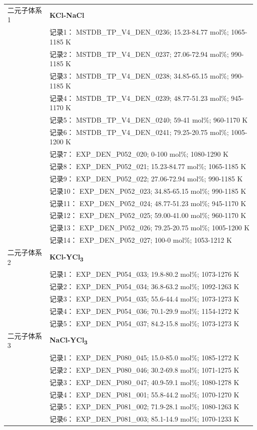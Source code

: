 \documentclass[12pt]{article}
\begin{document}
{\begin{longtable}[]{@{}
  >{\raggedright\arraybackslash}p{}
  >{\raggedright\arraybackslash}p{}@{}}
二元子体系 1  & \textbf{KCl-NaCl} \\
 & 记录1： MSTDB\_TP\_V4\_DEN\_0236; 15.23-84.77 mol\%; 1065-1185 K \\
 & 记录2： MSTDB\_TP\_V4\_DEN\_0237; 27.06-72.94 mol\%; 990-1185 K \\
 & 记录3： MSTDB\_TP\_V4\_DEN\_0238; 34.85-65.15 mol\%; 990-1185 K \\
 & 记录4： MSTDB\_TP\_V4\_DEN\_0239; 48.77-51.23 mol\%; 945-1170 K \\
 & 记录5： MSTDB\_TP\_V4\_DEN\_0240; 59-41 mol\%; 960-1170 K \\
 & 记录6： MSTDB\_TP\_V4\_DEN\_0241; 79.25-20.75 mol\%; 1005-1200 K \\
 & 记录7： EXP\_DEN\_P052\_020; 0-100 mol\%; 1080-1290 K \\
 & 记录8： EXP\_DEN\_P052\_021; 15.23-84.77 mol\%; 1065-1185 K \\
 & 记录9： EXP\_DEN\_P052\_022; 27.06-72.94 mol\%; 990-1185 K \\
 & 记录10： EXP\_DEN\_P052\_023; 34.85-65.15 mol\%; 990-1185 K \\
 & 记录11： EXP\_DEN\_P052\_024; 48.77-51.23 mol\%; 945-1170 K \\
 & 记录12： EXP\_DEN\_P052\_025; 59.00-41.00 mol\%; 960-1170 K \\
 & 记录13： EXP\_DEN\_P052\_026; 79.25-20.75 mol\%; 1005-1200 K \\
 & 记录14： EXP\_DEN\_P052\_027; 100-0 mol\%; 1053-1212 K  \\

二元子体系 2  & \textbf{KCl-YCl\textsubscript{3}} \\
 & 记录1： EXP\_DEN\_P054\_033; 19.8-80.2 mol\%; 1073-1276 K \\
 & 记录2： EXP\_DEN\_P054\_034; 36.8-63.2 mol\%; 1092-1263 K \\
 & 记录3： EXP\_DEN\_P054\_035; 55.6-44.4 mol\%; 1073-1273 K \\
 & 记录4： EXP\_DEN\_P054\_036; 70.1-29.9 mol\%; 1154-1272 K \\
 & 记录5： EXP\_DEN\_P054\_037; 84.2-15.8 mol\%; 1073-1273 K  \\

二元子体系 3  & \textbf{NaCl-YCl\textsubscript{3}} \\
 & 记录1： EXP\_DEN\_P080\_045; 15.0-85.0 mol\%; 1085-1272 K \\
 & 记录2： EXP\_DEN\_P080\_046; 30.2-69.8 mol\%; 1071-1275 K \\
 & 记录3： EXP\_DEN\_P080\_047; 40.9-59.1 mol\%; 1080-1278 K \\
 & 记录4： EXP\_DEN\_P081\_001; 55.8-44.2 mol\%; 1070-1270 K \\
 & 记录5： EXP\_DEN\_P081\_002; 71.9-28.1 mol\%; 1080-1263 K \\
 & 记录6： EXP\_DEN\_P081\_003; 85.1-14.9 mol\%; 1070-1233 K  \\


\end{longtable}}
\end{document}
